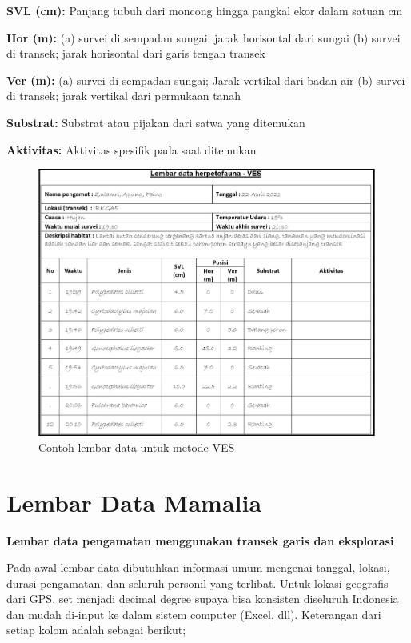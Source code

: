 \documentclass[
  oneside]{book}
\begin{document}
\textbf{SVL (cm):} Panjang tubuh dari moncong hingga pangkal ekor dalam satuan cm

\textbf{Hor (m):} (a) survei di sempadan sungai; jarak horisontal dari sungai (b) survei di transek; jarak horisontal dari garis tengah transek

\textbf{Ver (m):} (a) survei di sempadan sungai; Jarak vertikal dari badan air (b) survei di transek; jarak vertikal dari permukaan tanah

\textbf{Substrat:} Substrat atau pijakan dari satwa yang ditemukan

\textbf{Aktivitas:} Aktivitas spesifik pada saat ditemukan

\begin{figure}

{\centering \includegraphics[width=1\linewidth]{images/ldh_ves} 

}

\caption{Contoh lembar data untuk metode VES}\label{fig:ldhves}
\end{figure}

\hypertarget{lembar-data-mamalia}{%
\section*{Lembar Data Mamalia}\label{lembar-data-mamalia}}

\textbf{Lembar data pengamatan menggunakan transek garis dan eksplorasi}

Pada awal lembar data dibutuhkan informasi umum mengenai tanggal, lokasi, durasi pengamatan, dan seluruh personil yang terlibat. Untuk lokasi geografis dari GPS, set menjadi decimal degree supaya bisa konsisten diseluruh Indonesia dan mudah di-input ke dalam sistem computer (Excel, dll). Keterangan dari setiap kolom adalah sebagai berikut;
\end{document}
